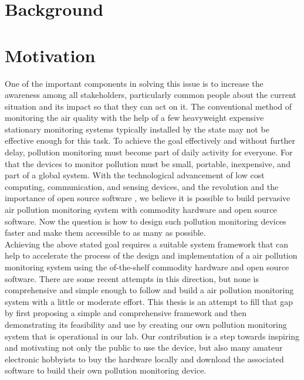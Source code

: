 \section{Background}






\section{Motivation}

One of the important components in solving this issue is to increase the awareness among all stakeholders, particularly common people about the current situation and its impact so that they can act on it. The conventional method of monitoring the air quality with the help of a few heavyweight expensive stationary monitoring systems typically installed by the state may not be effective enough for this task. To achieve the goal effectively and without further delay, pollution monitoring must become part of daily activity for everyone. For that the devices to monitor pollution must be small, portable, inexpensive, and part of a global system. With the technological advancement of low cost computing, communication, and sensing devices, and the revolution and the importance of open
source software \cite{Anthes2016}, we believe it is possible to build pervasive air pollution monitoring system with commodity hardware and open source software. Now the question is how to design such pollution monitoring devices faster and make them accessible to as many as possible.
\\
Achieving the above stated goal requires a suitable system framework that can help to accelerate the process of the design and implementation of a air pollution monitoring system using the of-the-shelf commodity hardware and open source software. There are some recent attempts in this direction, but none is comprehensive and simple enough to follow and build a air pollution monitoring system with a little or moderate effort. This thesis is an attempt to fill that gap by first proposing a simple and comprehensive framework and then demonstrating its feasibility and use by creating our own pollution monitoring system that is operational in our lab. Our contribution is a step towards inspiring and motivating not only the public to use the device, but also many amateur electronic hobbyists to buy the hardware locally and download the associated software to build their own pollution monitoring device.



